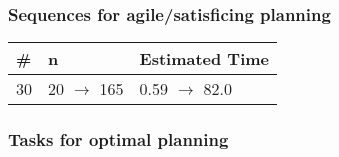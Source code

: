 \documentclass{article}
\begin{document}
                         \subsubsection*{Sequences for agile/satisficing planning}

                        \begin{center}
                        \begin{tabular}{@{}l|l|l@{}}
                        \# & n & Estimated Time\\\midrule
                        30&20 $\rightarrow$ 165&0.59 $\rightarrow$ 82.0
                        \end{tabular}
                        \end{center}
                    
                                \subsubsection*{Tasks for optimal planning}
                                
\end{document}
